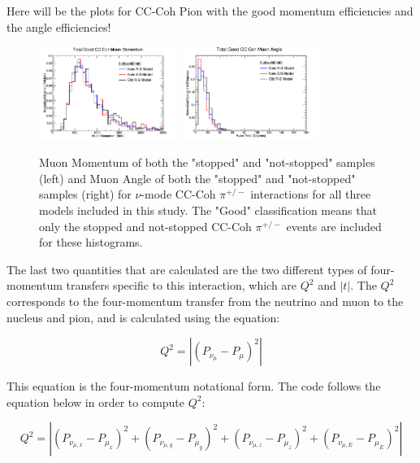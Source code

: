 \documentclass[11pt]{article}
\begin{document}
Here will be the plots for CC-Coh Pion with the good momentum efficiencies and the angle efficiencies!

\begin{figure}[H]
\centering
\includegraphics[width=0.4\textwidth]{CCCohPlots/NMCCCohGoodMomentum.png}
\includegraphics[width=0.4\textwidth]{CCCohPlots/NMCCCohGoodAngle.png}
\caption{Muon Momentum of both the "stopped" and "not-stopped" samples (left) and Muon Angle of both the "stopped" and "not-stopped" samples (right) for $\nu$-mode CC-Coh $\pi^{+/-}$ interactions for all three models included in this study. The "Good" classification means that only the stopped and not-stopped CC-Coh $\pi^{+/-}$ events are included for these histograms.}
\end{figure}\label{fig:NuModeCCCohGoodMomAndAng}

The last two quantities that are calculated are the two different types of four-momentum transfers specific to this interaction, which are $Q^2$ and $|t|$. The $Q^2$ corresponds to the four-momentum transfer from the neutrino and muon to the nucleus and pion, and is calculated using the equation:

\begin{equation}
Q^2 = |(P_{\nu_\mu} - P_\mu)^2|
\end{equation}

\noindent
This equation is the four-momentum notational form. The code follows the equation below in order to compute $Q^2$:

\begin{equation}
Q^2 = |(P_{\nu_{\mu,x}} - P_{\mu_x})^2 + (P_{\nu_{\mu,y}} - P_{\mu_y})^2 + (P_{\nu_{\mu,z}} - P_{\mu_z})^2 + (P_{\nu_{\mu,E}} - P_{\mu_E})^2|
\end{equation}
\end{document}
